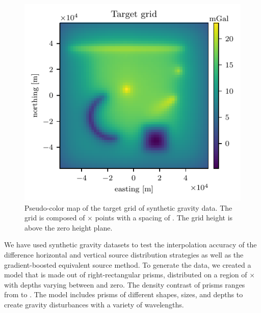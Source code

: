 \begin{figure}
    \includegraphics[width=\linewidth]{figs/target-grid.pdf}
    \caption{
        Pseudo-color map of the target grid of synthetic gravity data. The grid
        is composed of \TargetEastingSize{}$\times$\TargetNorthingSize{} points
        with a spacing of \TargetSpacing{}. The grid height is \TargetHeight{}
        above the zero height plane.
    }
    \label{fig:synthetic-target}
\end{figure}

We have used synthetic gravity datasets to test the interpolation accuracy of
the difference horizontal and vertical source distribution strategies as well
as the gradient-boosted equivalent source method.
To generate the data, we created a model that is made out of \NPrisms{}
right-rectangular prisms, distributed on a region of
\ModelEasting{}$\times$\ModelNorthing{} with depths varying between
\ModelDepth{} and zero.
The density contrast of prisms ranges from \ModelMinDensity{} to
\ModelMaxDensity{}.
The model includes prisms of different shapes, sizes, and depths to create
gravity disturbances with a variety of wavelengths.

